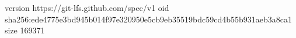 version https://git-lfs.github.com/spec/v1
oid sha256:ede4775e3bd945b014f97e320950e5cb9eb35519bdc59cd4b55b931aeb3a8ca1
size 169371
